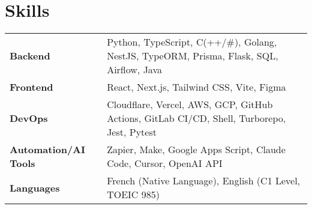 \documentclass[a4paper,10pt]{article}
\begin{document}
\section{Skills}

\begin{tabularx}{\linewidth}{@{}l X@{}}
    \textbf{Backend}             & \normalsize{Python, TypeScript, C(++/\#), Golang, NestJS, TypeORM, Prisma, Flask, SQL, Airflow, Java}   \\
    \textbf{Frontend}            & \normalsize{React, Next.js, Tailwind CSS, Vite, Figma}                                                  \\
    \textbf{DevOps}              & \normalsize{Cloudflare, Vercel, AWS, GCP, GitHub Actions, GitLab CI/CD, Shell, Turborepo, Jest, Pytest} \\
    \textbf{Automation/AI Tools} & \normalsize{Zapier, Make, Google Apps Script, Claude Code, Cursor, OpenAI API}                          \\
    \textbf{Languages}           & \normalsize{French (Native Language), English (C1 Level, TOEIC 985)}                                    \\
\end{tabularx}
\end{document}
